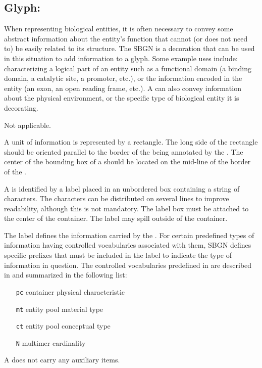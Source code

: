 
\subsection{Glyph: }
\label{sec:unitInfo}

When representing biological entities, it is often necessary to convey some abstract information about the entity's function that cannot (or does not need to) be easily related to its structure.  The SBGN  is a decoration that can be used in this situation to add information to a glyph.  Some example uses include: characterizing a logical part of an entity such as a functional domain (a binding domain, a catalytic site, a promoter, etc.), or the information encoded in the entity (an exon, an open reading frame, etc.).  A  can also convey information about the physical environment, or the specific type of biological entity it is decorating.

\begin{glyphDescription}

\glyphSboTerm Not applicable.

\glyphContainer A unit of information is represented by a rectangle.  The long side of the rectangle should be oriented parallel to the border of the  being annotated by the . The center of the bounding box of a  should be located on the mid-line of the border of the .

\glyphLabel A  is identified by a label placed in an unbordered box containing a string of characters.  The characters can be distributed on several lines to improve readability, although this is not mandatory.  The label box must be attached to the center of the container.  The label may spill outside of the container.

The label defines the information carried by the .  For certain predefined types of information having controlled vocabularies associated with them, SBGN defines specific prefixes that must be included in the label to indicate the type of information in question.  The controlled vocabularies predefined in \SBGNPDLone are described in  and summarized in the following list:

\begin{center}
  \begin{itemize}\setlength{\parskip}{0ex}
  \item[\texttt{pc}] container physical characteristic
  \item[\texttt{mt}] entity pool material type
  \item[\texttt{ct}] entity pool conceptual type
  \item[\texttt{N}]  multimer cardinality
  \end{itemize}
\end{center}

\glyphAux A  does not carry any auxiliary items.  

\end{glyphDescription}

